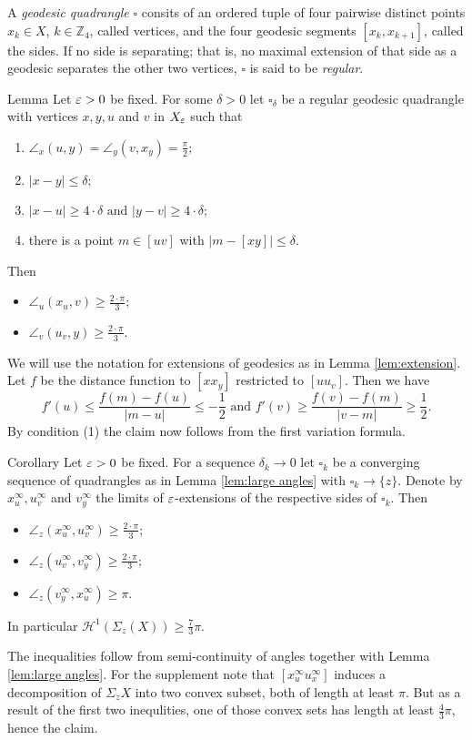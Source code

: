 \documentclass[a4paper,10pt]{amsart}
\begin{document}
A {\em geodesic quadrangle} $\square$ consits of an ordered tuple of four pairwise 
distinct points $x_k\in X$, $k\in\mathbb{Z}_4$, 
called vertices, and the four geodesic segments $[x_k,x_{k+1}]$, called the sides. 
If no side is separating; that is, no maximal extension of that side as a geodesic 
separates the other two vertices, $\square$ is said to be {\em regular}.

\begin{thm}{Lemma}\label{lem:large angles}
Let $\varepsilon>0$ be fixed. For some $\delta>0$ let $\square_\delta$ be a regular geodesic quadrangle with
vertices $x,y,u$ and $v$ in $X_\varepsilon$ such that
\begin{enumerate}
	\item $\angle_x(u,y)=\angle_y(v,x_y)=\frac{\pi}{2};$
	\item $|x-y|\leq\delta;$
	\item $|x-u|\geq 4\cdot\delta\text{ and }|y-v|\geq 4\cdot\delta;$
	\item there is a point $m\in [uv]$ with $|m-[xy]|\leq \delta.$
\end{enumerate}
Then 
\begin{itemize}
\item $\angle_u(x_u,v)\geq\frac{2{\cdot}\pi}{3};$
\item $\angle_v(u_v,y)\geq\frac{2{\cdot}\pi}{3}.$
\end{itemize}
\end{thm}

We will use the notation for extensions of geodesics as in Lemma \ref{lem:extension}.
Let $f$ be the distance function to $[x x_y]$ restricted to $[u u_v]$. Then we have
$$
f'(u)\leq\frac{f(m)-f(u)}{|m-u|}\leq-\frac{1}{2}\text{  and  }f'(v)\geq\frac{f(v)-f(m)}{|v-m|}\geq\frac{1}{2}.
$$
By condition (1) the claim now follows from the first variation formula.
\qeds

\begin{thm}{Corollary}
Let $\varepsilon>0$ be fixed. For a sequence $\delta_k\to 0$ let $\square_k$ be a converging sequence of quadrangles
as in Lemma \ref{lem:large angles} with $\square_k\to \{z\}$. Denote by $x^\infty_u, u^\infty_v$ and $v^\infty_y$
the limits of $\varepsilon$-extensions of the respective sides of $\square_k$. Then
\begin{itemize}
\item $\angle_z(x^\infty_u,u^\infty_v)\geq\frac{2{\cdot}\pi}{3};$
\item $\angle_z(u^\infty_v,v^\infty_y)\geq\frac{2{\cdot}\pi}{3};$
\item $\angle_z(v^\infty_y,x^\infty_u)\geq\pi.$
\end{itemize}
In particular $\mathcal{H}^1(\Sigma_z(X))\geq\frac{7}{3}\pi$.
\end{thm}
The inequalities follow from semi-continuity of angles together with Lemma \ref{lem:large angles}.
For the supplement note that $[x^\infty_u u^\infty_x]$ induces a decomposition of $\Sigma_z X$ into two convex subset, both of length at least $\pi$.
But as a result of the first two inequlities, one of those convex sets has length at least $\frac{4}{3}\pi$, hence the claim.
\qeds
\end{document}
